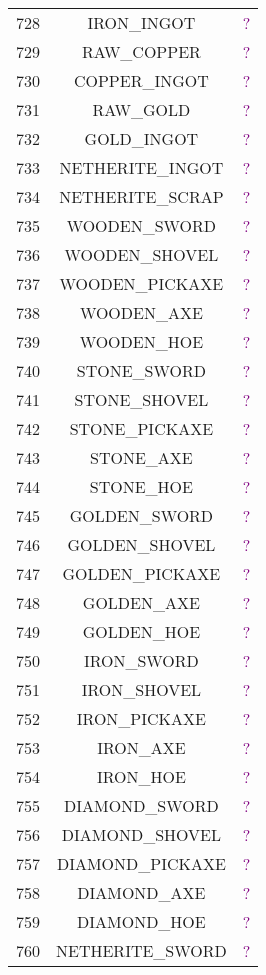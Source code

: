 \documentclass[11pt]{article}
\newcommand\myworries[1]{\textcolor{purple}{#1}}
\begin{document}
\begin{longtable}{ |c|c|c| }
	728 & IRON\_INGOT & \myworries{?} \\
	729 & RAW\_COPPER & \myworries{?} \\
	730 & COPPER\_INGOT & \myworries{?} \\
	731 & RAW\_GOLD & \myworries{?} \\
	732 & GOLD\_INGOT & \myworries{?} \\
	733 & NETHERITE\_INGOT & \myworries{?} \\
	734 & NETHERITE\_SCRAP & \myworries{?} \\
	735 & WOODEN\_SWORD & \myworries{?} \\
	736 & WOODEN\_SHOVEL & \myworries{?} \\
	737 & WOODEN\_PICKAXE & \myworries{?} \\
	738 & WOODEN\_AXE & \myworries{?} \\
	739 & WOODEN\_HOE & \myworries{?} \\
	740 & STONE\_SWORD & \myworries{?} \\
	741 & STONE\_SHOVEL & \myworries{?} \\
	742 & STONE\_PICKAXE & \myworries{?} \\
	743 & STONE\_AXE & \myworries{?} \\
	744 & STONE\_HOE & \myworries{?} \\
	745 & GOLDEN\_SWORD & \myworries{?} \\
	746 & GOLDEN\_SHOVEL & \myworries{?} \\
	747 & GOLDEN\_PICKAXE & \myworries{?} \\
	748 & GOLDEN\_AXE & \myworries{?} \\
	749 & GOLDEN\_HOE & \myworries{?} \\
	750 & IRON\_SWORD & \myworries{?} \\
	751 & IRON\_SHOVEL & \myworries{?} \\
	752 & IRON\_PICKAXE & \myworries{?} \\
	753 & IRON\_AXE & \myworries{?} \\
	754 & IRON\_HOE & \myworries{?} \\
	755 & DIAMOND\_SWORD & \myworries{?} \\
	756 & DIAMOND\_SHOVEL & \myworries{?} \\
	757 & DIAMOND\_PICKAXE & \myworries{?} \\
	758 & DIAMOND\_AXE & \myworries{?} \\
	759 & DIAMOND\_HOE & \myworries{?} \\
	760 & NETHERITE\_SWORD & \myworries{?} \\

\end{longtable}
\end{document}
